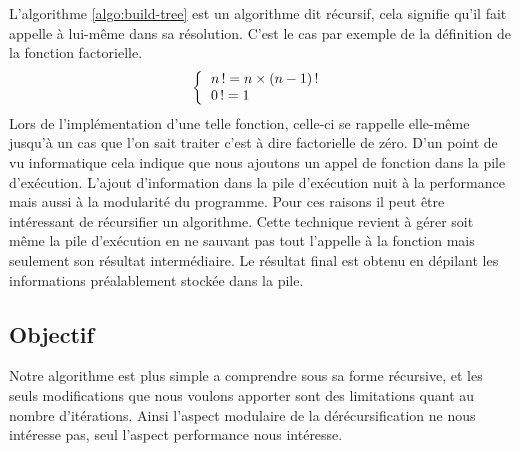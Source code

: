 L'algorithme \ref{algo:build-tree} est un algorithme dit récursif, cela signifie qu'il fait appelle à lui-même dans sa résolution. C'est le cas par exemple de la définition de la fonction factorielle.
	\begin{displaymath}
		\left\{\begin{tabular}{l}
			$n\,! = n \times (n-1)\,!$ \\
			$0\,!= 1$ \\
		\end{tabular}\right.
	\end{displaymath}
Lors de l'implémentation d'une telle fonction, celle-ci se rappelle elle-même jusqu'à un cas que l'on sait traiter c'est à dire factorielle de zéro. D'un point de vu informatique cela indique que nous ajoutons un appel de fonction dans la pile d'exécution. L'ajout d'information dans la pile d'exécution nuit à la performance mais aussi à la modularité du programme. Pour ces raisons il peut être intéressant de récursifier un algorithme. Cette technique revient à gérer soit même la pile d'exécution en ne sauvant pas tout l'appelle à la fonction mais seulement son résultat intermédiaire. Le résultat final est obtenu en dépilant les informations préalablement stockée dans la pile.


	\subsection{Objectif}

Notre algorithme est plus simple a comprendre sous sa forme récursive, et les seuls modifications que nous voulons apporter sont des limitations quant au nombre d'itérations. Ainsi l'aspect modulaire de la dérécursification ne nous intéresse pas, seul l'aspect performance nous intéresse.


